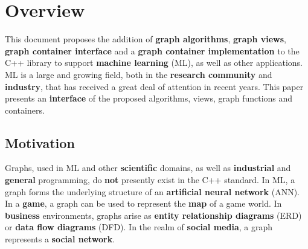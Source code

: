 
\section{Overview}

This document proposes the addition of \textbf{graph algorithms}, \textbf{graph views}, \textbf{graph container interface} and a \textbf{graph container implementation} to the C++ library to support \textbf{machine learning} (ML), as well as other applications. ML is a large and growing field, both in the \textbf{research community} and \textbf{industry}, that has received a great deal of attention in recent years. This paper presents an \textbf{interface} of the proposed algorithms, views, graph functions and containers.

\subsection{Motivation}
Graphs, used in ML and other \textbf{scientific} domains, as well as \textbf{industrial} and \textbf{general} programming, do \textbf{not} presently exist in the C++ standard. In ML, a graph forms the underlying structure of an \textbf{artificial neural network} (ANN). In a \textbf{game}, a graph can be used to
represent the \textbf{map} of a game world. In \textbf{business} environments, graphs arise as \textbf{entity relationship diagrams} (ERD) or \textbf{data flow diagrams} (DFD). In the realm of \textbf{social media}, a graph represents a \textbf{social network}.


